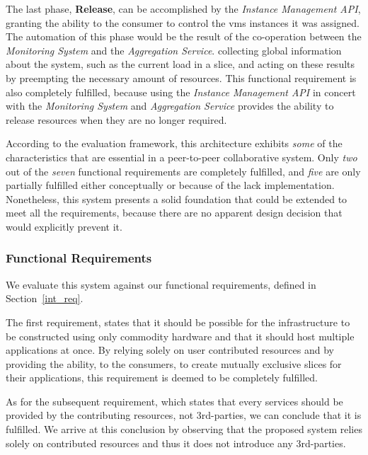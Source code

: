 \documentclass[12pt, titlepage]{uo_temp}
\begin{document}
     The last phase, \textbf{Release}, can be accomplished by the \emph{Instance
       Management API}, granting the ability to the consumer to control the \gls{vm}s
     instances it was assigned. The automation of this phase would be the result of the
     co-operation between the \emph{Monitoring System} and the \emph{Aggregation Service}.
     collecting global information about the system, such as the current load in a
     slice, and acting on these results by preempting the necessary amount of
     resources. This functional requirement is also completely fulfilled, because using
     the \emph{Instance Management API} in concert with the \emph{Monitoring System} and
     \emph{Aggregation Service} provides the ability to release resources when they are no
     longer required.
     
     According to the evaluation framework, this architecture exhibits \emph{some} of the
     characteristics that are essential in a peer-to-peer collaborative system. Only
     \emph{two} out of the \emph{seven} functional requirements are completely fulfilled,
     and \emph{five} are only partially fulfilled either conceptually or because of the
     lack implementation. Nonetheless, this system presents a solid foundation that could
     be extended to meet all the requirements, because there are no apparent design decision
     that would explicitly prevent it.

     \subsubsection{Functional Requirements}
     We evaluate this system against our functional requirements, defined in
     Section~\ref{int_req}.
     
     The first requirement, states that it should be possible for the infrastructure to be
     constructed using only commodity hardware and that it should host multiple
     applications at once. By relying solely on user contributed resources and by
     providing the ability, to the consumers, to create mutually exclusive slices for their
     applications, this requirement is deemed to be completely fulfilled.
     
     As for the subsequent requirement, which states that every services should be
     provided by the contributing resources, not 3rd-parties, we can conclude that it is
     fulfilled. We arrive at this conclusion by observing that the proposed system relies
     solely on contributed resources and thus it does not introduce any 3rd-parties.
\end{document}
